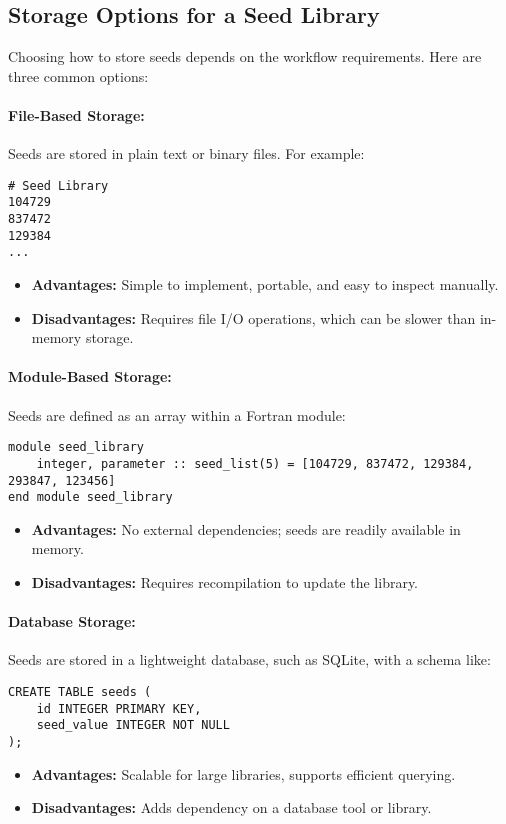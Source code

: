 \documentclass[12pt]{article}
\begin{document}
\subsection{Storage Options for a Seed Library}

Choosing how to store seeds depends on the workflow requirements. Here are three common options:

\paragraph{File-Based Storage:}
Seeds are stored in plain text or binary files. For example:
\begin{verbatim}
# Seed Library
104729
837472
129384
...
\end{verbatim}
\begin{itemize}
    \item \textbf{Advantages:} Simple to implement, portable, and easy to inspect manually.
    \item \textbf{Disadvantages:} Requires file I/O operations, which can be slower than in-memory storage.
\end{itemize}

\paragraph{Module-Based Storage:}
Seeds are defined as an array within a Fortran module:
\begin{verbatim}
module seed_library
    integer, parameter :: seed_list(5) = [104729, 837472, 129384, 293847, 123456]
end module seed_library
\end{verbatim}
\begin{itemize}
    \item \textbf{Advantages:} No external dependencies; seeds are readily available in memory.
    \item \textbf{Disadvantages:} Requires recompilation to update the library.
\end{itemize}

\paragraph{Database Storage:}
Seeds are stored in a lightweight database, such as SQLite, with a schema like:
\begin{verbatim}
CREATE TABLE seeds (
    id INTEGER PRIMARY KEY,
    seed_value INTEGER NOT NULL
);
\end{verbatim}
\begin{itemize}
    \item \textbf{Advantages:} Scalable for large libraries, supports efficient querying.
    \item \textbf{Disadvantages:} Adds dependency on a database tool or library.
\end{itemize}
\end{document}
